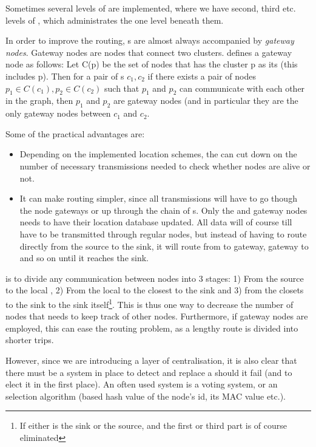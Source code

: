 \documentclass[letter, 12pt, english, draft]{article}
\begin{document}
Sometimes several levels of \ch are implemented, where we have second, third etc. levels of \ch, which administrates the \ch one level beneath them.  

In order to improve the routing, \ch s are almost always accompanied by \emph{gateway nodes}. Gateway nodes are nodes that connect two clusters. \cite{spanners} defines a gateway node as follows:
Let C(p) be the set of nodes that has the cluster p as its \ch (this includes p). Then for a pair of \ch s $c_1, c_2$ if there exists a pair of nodes $p_1 \in C(c_1), p_2 \in C(c_2)$ such that $p_1$ and $p_2$ can communicate with each other in the graph, then $p_1$ and $p_2$ are gateway nodes (and in particular they are the only gateway nodes between $c_1$ and $c_2$.  

Some of the practical advantages are:
\begin{itemize}
\item Depending on the implemented location schemes, the \ch can cut down on the number of necessary transmissions needed to check whether nodes are alive or not.
\item It can make routing simpler, since all transmissions will have to go though the node gateways or up through the chain of \ch s. Only the \ch and gateway nodes needs to have their location database updated. All data will of course till have to be transmitted through regular nodes, but instead of having to route directly from the source to the sink, it will route from \ch to gateway, gateway to \ch and so on until it reaches the sink.
\end{itemize}

\ch is to divide any communication between nodes into 3 stages: 1) From the source to the local \ch, 2) From the local \ch to the \ch closest to the sink and 3) from the \ch closets to the sink to the sink itself\footnote{If either \ch is the sink or the source, and the first or third part is of course eliminated}. This is thus one way to decrease the number of nodes that needs to keep track of other nodes. Furthermore, if gateway nodes are employed, this can ease the routing problem, as a lengthy route is divided into shorter trips.  

However, since we are introducing a layer of centralisation, it is also clear that there must be a system in place to detect and replace a \ch should it fail (and to elect it in the first place). An often used system is a voting system, or an selection algorithm (based hash value of the node's id, its MAC value etc.). 
\end{document}
